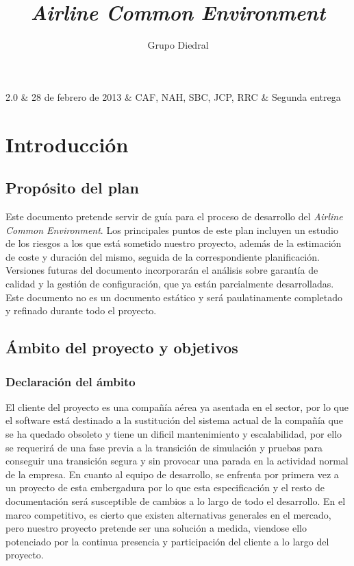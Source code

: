 \documentclass[11pt, a4paper, twoside, titlepage]{article}
\title{\doctitle\\\textsl{Airline Common Environment}}
\author{Grupo Diedral}
\newcommand*{\doctitle}{Plan de proyecto}
\newcommand*{\docversion}{2.0}
\begin{document}
	\begin{tablacambios}
		2.0 & 28 de febrero de 2013 & CAF, NAH, SBC, JCP, RRC & Segunda entrega
	\end{tablacambios}


	\portadaace{\doctitle}{\docversion}
	
	\tableofcontents
	\newpage

	\section{Introducción}
	\iniciarnumeraciondiedral
		\subsection{Propósito del plan}
			Este documento pretende servir de guía para el proceso de desarrollo del \software \textit{Airline Common Environment}. Los principales puntos de este plan incluyen un estudio de los riesgos a los que está sometido nuestro proyecto, además de la estimación de coste y duración del mismo, seguida de la correspondiente planificación. Versiones futuras del documento incorporarán el análisis sobre garantía de calidad y la gestión de configuración, que ya están parcialmente desarrolladas.\\

			Este documento no es un documento estático y será paulatinamente completado y refinado durante todo el proyecto.
		
		\subsection{Ámbito del proyecto y objetivos}
			\subsubsection{Declaración del ámbito}
			El cliente del proyecto es una compañía aérea ya asentada en el sector, por lo que el software está destinado a la sustitución del sistema actual de la compañía que se ha quedado obsoleto y tiene un dificil mantenimiento y escalabilidad, por ello se requerirá de una fase previa a la transición de simulación y pruebas para conseguir una transición segura y sin provocar una parada en la actividad normal de la empresa.
			En cuanto al equipo de desarrollo, se enfrenta por primera vez a un proyecto de esta embergadura por lo que esta especificación y el resto de documentación será susceptible de cambios a lo largo de todo el desarrollo.
			En el marco competitivo, es cierto que existen alternativas generales en el mercado, pero nuestro proyecto pretende ser una solución a medida, viendose ello potenciado por la continua presencia y participación del cliente a lo largo del proyecto.
\end{document}
